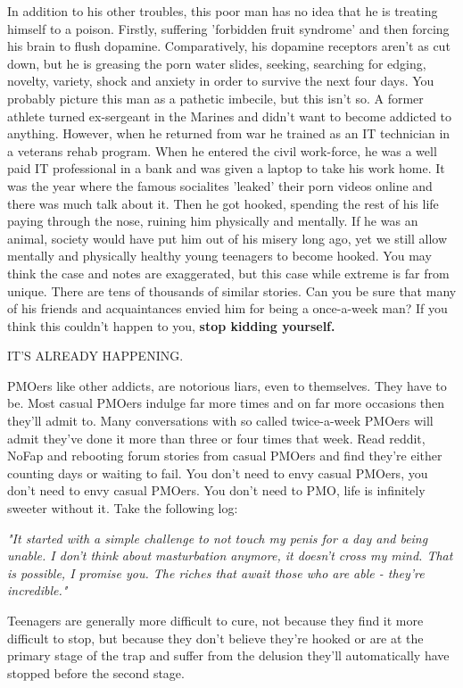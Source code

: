 \documentclass[easypeasy]{subfiles}
\begin{document}
In addition to his other troubles, this poor man has no idea that he is treating himself to a poison. Firstly, suffering 'forbidden fruit syndrome' and then forcing his brain to flush dopamine. Comparatively, his dopamine receptors aren't as cut down, but he is greasing the porn water slides, seeking, searching for edging, novelty, variety, shock and anxiety in order to survive the next four days. You probably picture this man as a pathetic imbecile, but this isn't so. A former athlete turned ex-sergeant in the Marines and didn't want to become addicted to anything. However, when he returned from war he trained as an IT technician in a veterans rehab program. When he entered the civil work-force, he was a well paid IT professional in a bank and was given a laptop to take his work home. It was the year where the famous socialites 'leaked' their porn videos online and there was much talk about it. Then he got hooked, spending the rest of his life paying through the nose, ruining him physically and mentally. If he was an animal, society would have put him out of his misery long ago, yet we still allow mentally and physically healthy young teenagers to become hooked. You may think the case and notes are exaggerated, but this case while extreme is far from unique. There are tens of thousands of similar stories. Can you be sure that many of his friends and acquaintances envied him for being a once-a-week man? If you think this couldn't happen to you, \textbf{stop kidding yourself.}

{\huge IT'S ALREADY HAPPENING.}

PMOers like other addicts, are notorious liars, even to themselves. They have to be. Most casual PMOers indulge far more times and on far more occasions then they'll admit to. Many conversations with so called twice-a-week PMOers will admit they've done it more than three or four times that week. Read reddit, NoFap and rebooting forum stories from casual PMOers and find they're either counting days or waiting to fail. You don't need to envy casual PMOers, you don't need to envy casual PMOers. You don't need to PMO, life is infinitely sweeter without it. Take the following log:

  \textit{"It started with a simple challenge to not touch my penis for a day and being unable. I don't think about masturbation anymore, it doesn't cross my mind. That is possible, I promise you. The riches that await those who are able - they're incredible."}

Teenagers are generally more difficult to cure, not because they find it more difficult to stop, but because they don't believe they're hooked or are at the primary stage of the trap and suffer from the delusion they'll automatically have stopped before the second stage.
\end{document}
